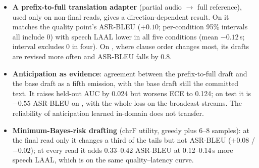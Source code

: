 \begin{itemize}[leftmargin=*,itemsep=1pt]
  Its development BLEU rose by 0.9--3.7 points, but \enzh{} test ASR-BLEU fell by 2.5 points at the same threshold, and the loss is concentrated on the broadcast streams (text BLEU $-1.9$ to $-2.3$) rather than on real interpreting ($-0.4$ to $+0.5$).
  Whole-utterance decoding on held-out read speech explains the loss: outputs grow 3--5\% longer because the adapter keeps continuing past the end of complete audio, i.e.\ the model cannot tell truncated from finished input.
  Halving the adapter, decoding the final read with the base drafter, capping commitments by agreement with the base drafter, and moving to the quality threshold all stay on or below the base drafter's quality--latency curve.
  \item \textbf{A prefix-to-full translation adapter} (partial audio $\rightarrow$ full reference), used only on non-final reads, gives a direction-dependent result.
  On \zhen{} it matches the quality point's ASR-BLEU ($+0.10$; per-condition 95\% intervals all include 0) with speech LAAL lower in all five conditions (mean $-0.12$\,s; interval excludes 0 in four).
  On \enzh{}, where clause order changes most, its drafts are revised more often and ASR-BLEU falls by 0.8.
  \item \textbf{Anticipation as evidence}: agreement between the prefix-to-full draft and the base draft as a fifth emission, with the base draft still the committed text.
  It raises held-out AUC by 0.024 but worsens ECE to 0.124; on test it is $-0.55$ ASR-BLEU on \enzh{}, with the whole loss on the broadcast streams.
  The reliability of anticipation learned in-domain does not transfer.
  \item \textbf{Minimum-Bayes-risk drafting} (chrF utility, greedy plus 6--8 samples): at the final read only it changes a third of the tails but not ASR-BLEU ($+0.08$ / $-0.02$); at every read it adds 0.33--0.42 ASR-BLEU at 0.12--0.14\,s more speech LAAL, which is on the same quality--latency curve.
\end{itemize}
